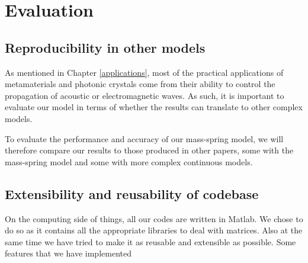 \chapter{Evaluation}
\section{Reproducibility in other models}
As mentioned in Chapter \ref{applications}, most of the practical applications
of metamaterials and photonic crystals come from their ability to control the
propagation of acoustic or electromagnetic waves. As such, it is important to
evaluate our model in terms of whether the results can translate to other
complex models.

To evaluate the performance and accuracy of our mass-spring model, we will
therefore compare our results to those produced in other papers, some with the
mass-spring model and some with more complex continuous models.

\section{Extensibility and reusability of codebase}
On the computing side of things, all our codes are written in Matlab. We chose
to do so as it contains all the appropriate libraries to deal with matrices.
Also at the same time we have tried to make it as reusable and extensible as
possible. Some features that we have implemented


